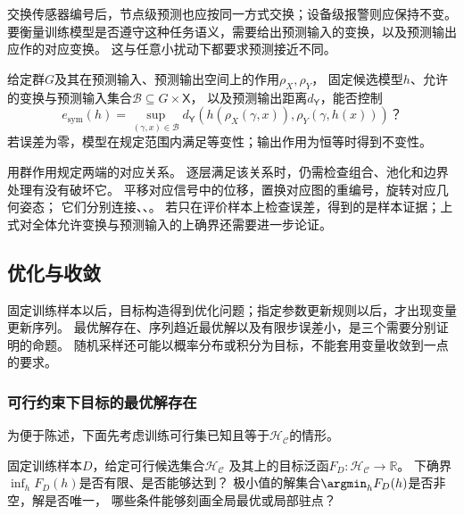 交换传感器编号后，节点级预测也应按同一方式交换；设备级报警则应保持不变。
要衡量训练模型是否遵守这种任务语义，需要给出预测输入的变换，以及预测输出应作的对应变换。
这与任意小扰动下都要求预测接近不同。

\begin{mathproblem}[预测输入变换与预测输出对应的误差]
  \label{question:future-structural-property}
  给定群$G$及其在预测输入、预测输出空间上的作用$\rho_X,\rho_Y$，
  固定候选模型$h$、允许的变换与预测输入集合$\mathcal B\subseteq G\times\mathsf X$，
  以及预测输出距离$d_{\mathsf Y}$，能否控制
  \[
    e_{\mathrm{sym}}(h)=\sup_{(\gamma,x)\in\mathcal B}
    d_{\mathsf Y}\!\left(h(\rho_X(\gamma,x)),\rho_Y(\gamma,h(x))\right)\text{？}
  \]
  若误差为零，模型在规定范围内满足等变性；输出作用为恒等时得到不变性。
\end{mathproblem}

用群作用规定两端的对应关系。
逐层满足该关系时，仍需检查组合、池化和边界处理有没有破坏它。
平移对应信号中的位移，置换对应图的重编号，旋转对应几何姿态；
它们分别连接、、。
若只在评价样本上检查误差，得到的是样本证据；上式对全体允许变换与预测输入的上确界还需要进一步论证。

\subsection{优化与收敛}
\label{sec:future-objective-object-map}
\label{sec:future-iteration-object-map}

固定训练样本以后，目标构造得到优化问题；指定参数更新规则以后，才出现变量更新序列。
最优解存在、序列趋近最优解以及有限步误差小，是三个需要分别证明的命题。
随机采样还可能以概率分布或积分为目标，不能套用变量收敛到一点的要求。

\subsubsection{可行约束下目标的最优解存在}
\label{sec:future-analysis-minimizer}

为便于陈述，下面先考虑训练可行集已知且等于$\mathcal H_{\mathcal C}$的情形。

\begin{mathproblem}[目标泛函的极小值与解]
  \label{question:future-minimizer}
  固定训练样本$D$，给定可行候选集合$\mathcal H_{\mathcal C}$
  及其上的目标泛函$F_D:\mathcal H_{\mathcal C}\to\mathbb R$。
  下确界$\inf_hF_D(h)$是否有限、是否能够达到？
  极小值的解集合$\argmin_hF_D(h)$是否非空，解是否唯一，
  哪些条件能够刻画全局最优或局部驻点？
\end{mathproblem}

